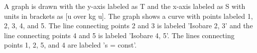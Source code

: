 A graph is drawn with the y-axis labeled as T and the x-axis labeled as S with units in brackets as [u over kg u]. The graph shows a curve with points labeled 1, 2, 3, 4, and 5. The line connecting points 2 and 3 is labeled 'Isobare 2, 3' and the line connecting points 4 and 5 is labeled 'Isobare 4, 5'. The lines connecting points 1, 2, 5, and 4 are labeled 's = const'.